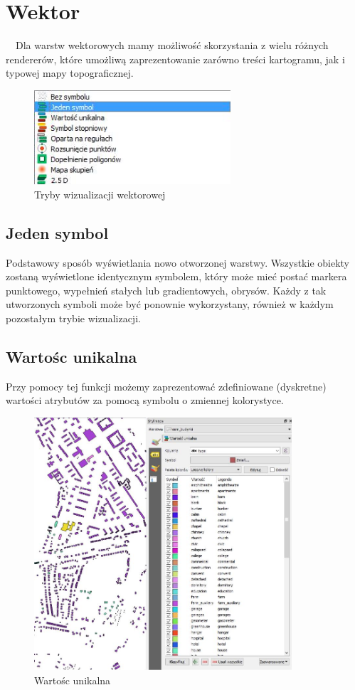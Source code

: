 \documentclass[12pt,a4paper]{book}
\begin{document}
\section{Wektor}
\ \ Dla warstw wektorowych mamy możliwość skorzystania z wielu różnych rendererów, które umożliwą zaprezentowanie zarówno treści kartogramu, jak i typowej mapy topograficznej.
\begin{figure}[ht]
	\centering
	\includegraphics[height=3.50cm]{007-wektor-tryby.jpg}
	\caption{Tryby wizualizacji wektorowej}
\end{figure}
\subsection{Jeden symbol}
Podstawowy sposób wyświetlania nowo otworzonej warstwy. Wszystkie obiekty zostaną wyświetlone identycznym symbolem, który może mieć postać markera punktowego, wypełnień stałych lub gradientowych, obrysów. Każdy z tak utworzonych symboli może być ponownie wykorzystany, również w każdym pozostałym trybie wizualizacji. 
\subsection{Wartośc unikalna}
Przy pomocy tej funkcji możemy zaprezentować zdefiniowane (dyskretne) wartości atrybutów za pomocą symbolu o zmiennej kolorystyce.

\begin{figure}[ht]
	\centering
	\includegraphics[height=9.4cm]{007-wektor-unikalna.jpg}
	\caption{Wartośc unikalna}
\end{figure}
\end{document}
